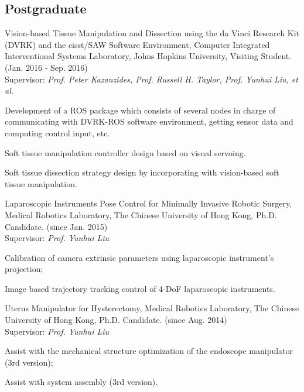 \documentclass[10pt,letterpaper]{article}
\renewenvironment{itemize}{
  \begin{list}{}{
    \setlength{\leftmargin}{1.5em}
    \setlength{\itemsep}{0.25em}
    \setlength{\parskip}{0pt}
    \setlength{\parsep}{0.25em}
  }
}{
  \end{list}
}
\begin{document}
\subsection*{Postgraduate}
\begin{itemize}
\item Vision-based Tissue Manipulation and Dissection using the da Vinci Research Kit (DVRK) and the cisst/SAW Software Environment, Computer Integrated Interventional Systems Laboratory, Johns Hopkins University, Visiting Student. (Jan. 2016 - Sep. 2016) \\
  Supervisor: \textit{Prof. Peter Kazanzides, Prof. Russell H. Taylor, Prof. Yunhui Liu, et al.}
  \begin{itemize}
  \item Development of a ROS package which consists of several nodes in charge of communicating with DVRK-ROS software environment, getting sensor data and computing control input, etc.
  \item Soft tissue manipulation controller design based on visual servoing.
  \item Soft tissue dissection strategy design by incorporating with vision-based soft tissue manipulation.
  \end{itemize}

\item Laparoscopic Instruments Pose Control for Minimally Invasive Robotic Surgery, Medical Robotics Laboratory, The Chinese University of Hong Kong, Ph.D. Candidate. (since Jan. 2015) \\
  Supervisor: \textit{Prof. Yunhui Liu}
  \begin{itemize}
  \item Calibration of camera extrinsic parameters using laparoscopic instrument's projection;
  \item Image based trajectory tracking control of 4-DoF laparoscopic instruments.
  \end{itemize}

\item Uterus Manipulator for Hysterectomy, Medical Robotics Laboratory, The Chinese University of Hong Kong, Ph.D. Candidate. (since Aug. 2014) \\
  Supervisor: \textit{Prof. Yunhui Liu}
  \begin{itemize}
  \item Assist with the mechanical structure optimization of the endoscope manipulator (3rd version);
  \item Assist with system assembly (3rd version).
  \end{itemize}


\end{itemize}
\end{document}
